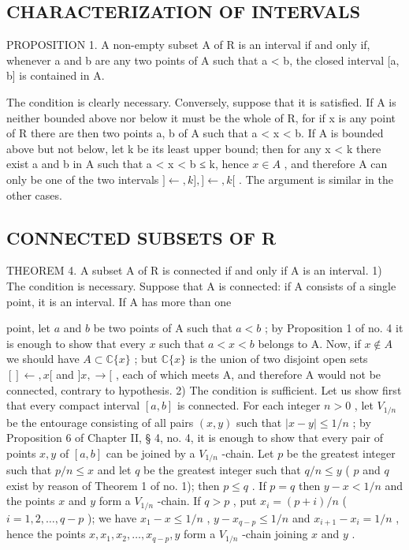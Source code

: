 \subsection{CHARACTERIZATION OF INTERVALS}

PROPOSITION 1. A non-empty subset A of R is an interval if and only if, whenever a and b are any two points of A such that a \textless{} b, the closed interval {[}a, b{]} is contained in A.

The condition is clearly necessary. Conversely, suppose that it is satisfied. If A is neither bounded above nor below it must be the whole of R, for if x is any point of R there are then two points a, b of A such that a \textless{} x \textless{} b. If A is bounded above but not below, let k be its least upper bound; then for any x \textless{} k there exist a and b in A such that a \textless{} x \textless{} b ≤ k, hence \(x \in A\) , and therefore A can only be one of the two intervals \(] \leftarrow, k],] \leftarrow, k[\) . The argument is similar in the other cases.

\subsection{CONNECTED SUBSETS OF R}

THEOREM 4. A subset A of R is connected if and only if A is an interval. 1) The condition is necessary. Suppose that A is connected: if A consists of a single point, it is an interval. If A has more than one

point, let \(a\) and \(b\) be two points of A such that \(a < b\) ; by Proposition 1 of no. 4 it is enough to show that every \(x\) such that \(a < x < b\) belongs to A. Now, if \(x \notin A\) we should have \(A \subset \mathbb{C}\{x\}\) ; but \(\mathbb{C}\{x\}\) is the union of two disjoint open sets \([] \leftarrow, x[\) and \(]x, \rightarrow[\) , each of which meets A, and therefore A would not be connected, contrary to hypothesis. 2) The condition is sufficient. Let us show first that every compact interval \([a, b]\) is connected. For each integer \(n > 0\) , let \(V_{1/n}\) be the entourage consisting of all pairs \((x, y)\) such that \(|x - y| \leqslant 1/n\) ; by Proposition 6 of Chapter II, § 4, no. 4, it is enough to show that every pair of points \(x, y\) of \([a, b]\) can be joined by a \(V_{1/n}\) -chain. Let \(p\) be the greatest integer such that \(p/n \leqslant x\) and let \(q\) be the greatest integer such that \(q/n \leqslant y\) ( \(p\) and \(q\) exist by reason of Theorem 1 of no. 1); then \(p \leqslant q\) . If \(p = q\) then \(y - x < 1/n\) and the points \(x\) and \(y\) form a \(V_{1/n}\) -chain. If \(q > p\) , put \(x_i = (p + i)/n\) ( \(i = 1, 2, \ldots, q - p\) ); we have \(x_1 - x \leqslant 1/n\) , \(y - x_{q-p} \leqslant 1/n\) and \(x_{i+1} - x_i = 1/n\) , hence the points \(x, x_1, x_2, \ldots, x_{q-p}, y\) form a \(V_{1/n}\) -chain joining \(x\) and \(y\) .

